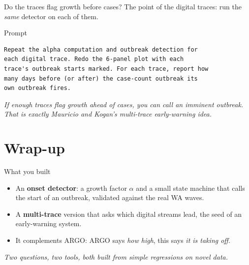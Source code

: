 \documentclass[aspectratio=169,11pt]{beamer}
\begin{document}
\begin{frame}[fragile]{Do the traces flag growth before cases?}
  The point of the digital traces: run the \emph{same} detector on each of them.
  \begin{block}{Prompt}
  \begin{lstlisting}
Repeat the alpha computation and outbreak detection for
each digital trace. Redo the 6-panel plot with each
trace's outbreak starts marked. For each trace, report how
many days before (or after) the case-count outbreak its
own outbreak fires.
  \end{lstlisting}
  \end{block}
  \begin{center}
    \itshape If enough traces flag growth ahead of cases, you can call an imminent outbreak.
    That is exactly Mauricio and Kogan's multi-trace early-warning idea.
  \end{center}
\end{frame}

\section{Wrap-up}

\begin{frame}{What you built}
  \begin{itemize}
    \item An \textbf{onset detector}: a growth factor $\alpha$ and a small state machine that
          calls the start of an outbreak, validated against the real WA waves.
    \item A \textbf{multi-trace} version that asks which digital streams lead, the seed of an
          early-warning system.
    \item It complements ARGO: ARGO says \emph{how high}, this says \emph{it is taking off}.
  \end{itemize}
  \vfill
  \begin{center}
    \itshape Two questions, two tools, both built from simple regressions on novel data.
  \end{center}
\end{frame}
\end{document}
